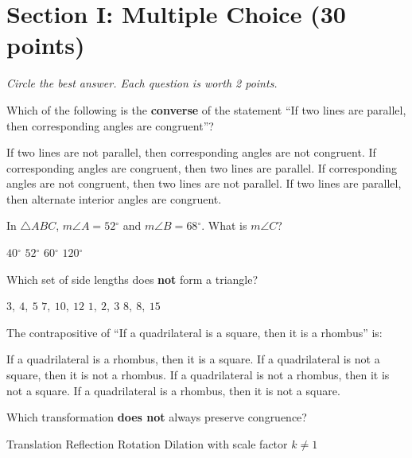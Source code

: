 \documentclass[12pt,addpoints]{exam}
\newcommand{\deg}{{}^\circ}
\begin{document}
\newpage

\section*{Section I: Multiple Choice \hfill (30 points)}
\noindent\textit{Circle the best answer. Each question is worth 2 points.}

\begin{questions}

\question Which of the following is the \textbf{converse} of the statement ``If two lines are parallel, then corresponding angles are congruent''?
\begin{choices}
  \choice If two lines are not parallel, then corresponding angles are not congruent.
  \choice If corresponding angles are congruent, then two lines are parallel.
  \choice If corresponding angles are not congruent, then two lines are not parallel.
  \choice If two lines are parallel, then alternate interior angles are congruent.
\end{choices}

\question In $\triangle ABC$, $m\angle A = 52\deg$ and $m\angle B = 68\deg$. What is $m\angle C$?
\begin{choices}
  \choice $40\deg$
  \choice $52\deg$
  \choice $60\deg$
  \choice $120\deg$
\end{choices}

\question Which set of side lengths does \textbf{not} form a triangle?
\begin{choices}
  \choice $3,\ 4,\ 5$
  \choice $7,\ 10,\ 12$
  \choice $1,\ 2,\ 3$
  \choice $8,\ 8,\ 15$
\end{choices}

\question The contrapositive of ``If a quadrilateral is a square, then it is a rhombus'' is:
\begin{choices}
  \choice If a quadrilateral is a rhombus, then it is a square.
  \choice If a quadrilateral is not a square, then it is not a rhombus.
  \choice If a quadrilateral is not a rhombus, then it is not a square.
  \choice If a quadrilateral is a rhombus, then it is not a square.
\end{choices}

\question Which transformation \textbf{does not} always preserve congruence?
\begin{choices}
  \choice Translation
  \choice Reflection
  \choice Rotation
  \choice Dilation with scale factor $k \neq 1$
\end{choices}


\end{questions}
\end{document}
